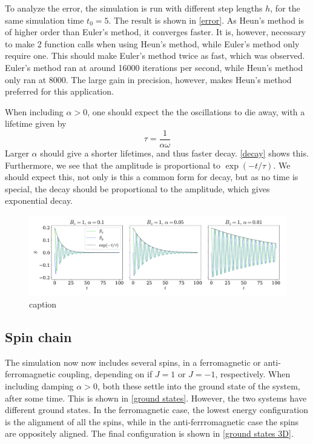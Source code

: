 \documentclass{article}
\begin{document}
    
    To analyze the error, the simulation is run with different step lengths $h$, for the same simulation time $t_0 = 5$. The result is shown in \autoref{error}. As Heun's method is of higher order than Euler's method, it converges faster. It is, however, necessary to make 2 function calls when using Heun's method, while Euler's method only require one. This should make Euler's method twice as fast, which was observed. Euler's method ran at around 16000 iterations per second, while Heun's method only ran at 8000. The large gain in precision, however, makes Heun's method preferred for this application. 

    When including $\alpha > 0$, one should expect the the oscillations to die away, with a lifetime given by
    \begin{equation*}
        \tau = \frac{1}{\alpha \omega}
    \end{equation*}
    Larger $\alpha$ should give a shorter lifetimes, and thus faster decay. \autoref{decay} shows this. Furthermore, we see that the amplitude is proportional to $\exp(-t/\tau)$. We should expect this, not only is this a common form for decay, but as no time is special, the decay should be proportional to the amplitude, which gives exponential decay.

    \begin{figure}[H]
        \centering
        \includegraphics[width=\textwidth]{../plots/decay_a.pdf}
        \caption{caption}
        \label{decay}
    \end{figure}

    \subsection*{Spin chain}
    The simulation now now includes several spins, in a ferromagnetic or anti-ferromagnetic coupling, depending on if $J = 1$ or $J = -1$, respectively. When including damping $\alpha > 0$, both these settle into the ground state of the system, after some time. This is shown in \autoref{ground states}. However, the two systems have different ground states. In the ferromagnetic case, the lowest energy configuration is the alignment of all the spins, while in the anti-ferrromagnetic case the spins are oppositely aligned. The final configuration is shown in \autoref{ground states 3D}.
\end{document}
